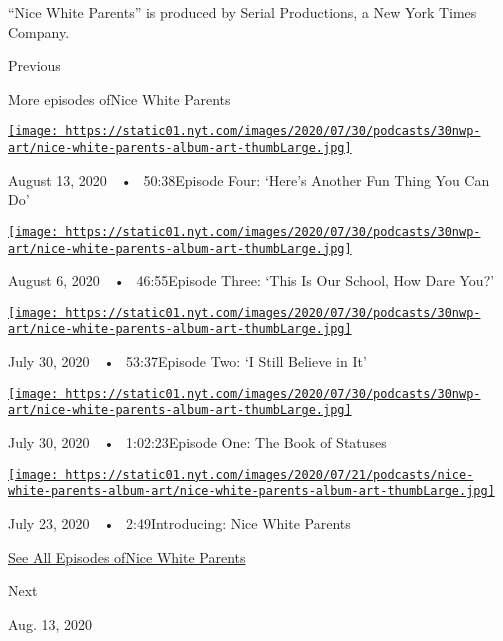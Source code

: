 ``Nice White Parents'' is produced by Serial Productions, a New York
Times Company.

Previous

More episodes ofNice White Parents

\href{https://www.nytimes.com/2020/08/13/podcasts/nice-white-parents-school.html?action=click\&module=audio-series-bar\&region=header\&pgtype=Article}{\texttt{[image: https://static01.nyt.com/images/2020/07/30/podcasts/30nwp-art/nice-white-parents-album-art-thumbLarge.jpg]}}

August 13, 2020~~•~ 50:38Episode Four: `Here's Another Fun Thing You Can
Do'

\href{https://www.nytimes.com/2020/08/06/podcasts/episode-three-this-is-our-school-how-dare-you.html?action=click\&module=audio-series-bar\&region=header\&pgtype=Article}{\texttt{[image: https://static01.nyt.com/images/2020/07/30/podcasts/30nwp-art/nice-white-parents-album-art-thumbLarge.jpg]}}

August 6, 2020~~•~ 46:55Episode Three: `This Is Our School, How Dare
You?'

\href{https://www.nytimes.com/2020/07/30/podcasts/nice-white-parents-serial-2.html?action=click\&module=audio-series-bar\&region=header\&pgtype=Article}{\texttt{[image: https://static01.nyt.com/images/2020/07/30/podcasts/30nwp-art/nice-white-parents-album-art-thumbLarge.jpg]}}

July 30, 2020~~•~ 53:37Episode Two: `I Still Believe in It'

\href{https://www.nytimes.com/2020/07/30/podcasts/nice-white-parents-serial.html?action=click\&module=audio-series-bar\&region=header\&pgtype=Article}{\texttt{[image: https://static01.nyt.com/images/2020/07/30/podcasts/30nwp-art/nice-white-parents-album-art-thumbLarge.jpg]}}

July 30, 2020~~•~ 1:02:23Episode One: The Book of Statuses

\href{https://www.nytimes.com/2020/07/23/podcasts/nice-white-parents-serial.html?action=click\&module=audio-series-bar\&region=header\&pgtype=Article}{\texttt{[image: https://static01.nyt.com/images/2020/07/21/podcasts/nice-white-parents-album-art/nice-white-parents-album-art-thumbLarge.jpg]}}

July 23, 2020~~•~ 2:49Introducing: Nice White Parents

\href{https://www.nytimes.com/column/nice-white-parents}{See All
Episodes ofNice White Parents}

Next

Aug. 13, 2020

